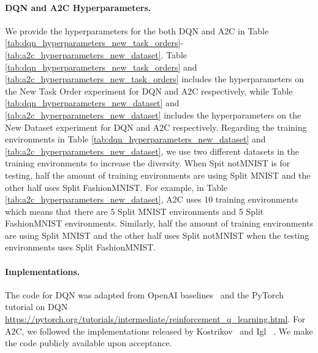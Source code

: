 \vspace{-3mm}
\paragraph{DQN and A2C Hyperparameters.}
We provide the hyperparameters for the both DQN and A2C in Table \ref{tab:dqn_hyperparameters_new_task_orders}-\ref{tab:a2c_hyperparameters_new_dataset}. Table \ref{tab:dqn_hyperparameters_new_task_orders} and \ref{tab:a2c_hyperparameters_new_task_orders} includes the hyperparameters on the New Task Order experiment for DQN and A2C respectively, while Table \ref{tab:dqn_hyperparameters_new_dataset} and \ref{tab:a2c_hyperparameters_new_dataset} includes the hyperparameters on the New Dataset experiment for DQN and A2C respectively. Regarding the training environments in Table \ref{tab:dqn_hyperparameters_new_dataset} and \ref{tab:a2c_hyperparameters_new_dataset}, we use two different datasets in the training environments to increase the diversity. When Spit notMNIST is for testing, half the amount of training environments are using Split MNIST and the other half uses Split FashionMNIST. For example, in Table \ref{tab:a2c_hyperparameters_new_dataset}, A2C uses 10 training environments which means that there are 5 Split MNIST environments and 5 Split FashionMNIST environments. Similarly, half the amount of training environments are using Split MNIST and the other half uses Split notMNIST when the testing environments uses Split FashionMNIST.   

\vspace{-3mm}
\paragraph{Implementations.} 
The code for DQN was adapted from OpenAI baselines~ and the PyTorch~ tutorial on DQN {\small \url{https://pytorch.org/tutorials/intermediate/reinforcement_q_learning.html}}. For A2C, we followed the implementations released by Kostrikov~ and Igl \etal~. We make the code publicly available upon acceptance. 



